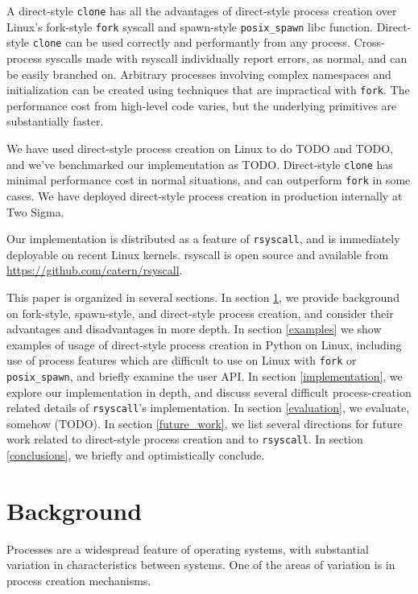 \documentclass{acmart}
\begin{document}
A direct-style \texttt{clone} has all the advantages of direct-style process creation
over Linux's fork-style \texttt{fork} syscall and spawn-style \texttt{posix\_spawn} libc function.
Direct-style \texttt{clone} can be used correctly and performantly from any process.
Cross-process syscalls made with rsyscall individually report errors, as normal, and can be easily branched on.
Arbitrary processes involving complex namespaces and initialization can be created
using techniques that are impractical with \texttt{fork}.
The performance cost from high-level code varies, but the underlying primitives are substantially faster.

We have used direct-style process creation on Linux to do TODO and TODO,
and we've benchmarked our implementation as TODO.
Direct-style \texttt{clone} has minimal performance cost in normal situations,
and can outperform \texttt{fork} in some cases.
We have deployed direct-style process creation in production internally at Two Sigma.

Our implementation is distributed as a feature of \texttt{rsyscall},
and is immediately deployable on recent Linux kernels.
rsyscall is open source and available from \url{https://github.com/catern/rsyscall}.

This paper is organized in several sections.
In section \ref{background}, we provide background on fork-style, spawn-style, and direct-style process creation,
and consider their advantages and disadvantages in more depth.
In section \ref{examples} we show examples of usage of direct-style process creation in Python on Linux,
including use of process features which are difficult to use on Linux with \texttt{fork} or \texttt{posix\_spawn},
and briefly examine the user API.
In section \ref{implementation}, we explore our implementation in depth,
and discuss several difficult process-creation related details of \texttt{rsyscall}'s implementation.
In section \ref{evaluation}, we evaluate, somehow (TODO).
In section \ref{future_work},
we list several directions for future work related to direct-style process creation and to \texttt{rsyscall}.
In section \ref{conclusions}, we briefly and optimistically conclude.

\section{Background}\label{background}
Processes are a widespread feature of operating systems,
with substantial variation in characteristics between systems.
One of the areas of variation is in process creation mechanisms.
\end{document}
